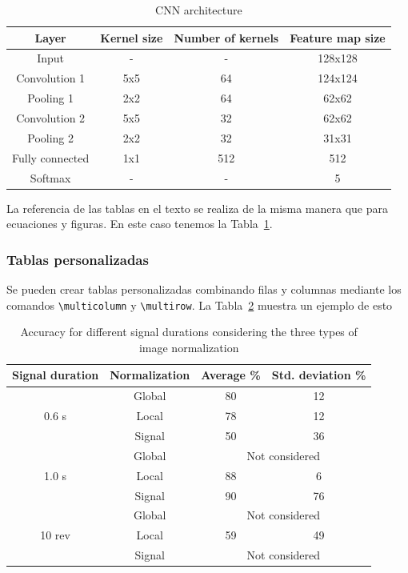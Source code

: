 \begin{table}[h]
	\centering
	\caption{CNN architecture}
	\label{tab:CNNArchitecture}
	\begin{tabular}{cccc}
		\toprule
		Layer & Kernel size & Number of kernels & Feature map size \\
		\midrule
		Input & - & - & 128x128 \\
		Convolution 1 & 5x5 & 64 & 124x124 \\
		Pooling 1 & 2x2 & 64 & 62x62 \\
		Convolution 2 & 5x5 & 32 & 62x62 \\
		Pooling 2 & 2x2 & 32 & 31x31 \\
		Fully connected & 1x1 & 512 & 512 \\
		Softmax & - & - & 5 \\
		\bottomrule
	\end{tabular}
\end{table}

La referencia de las tablas en el texto se realiza de la misma manera que para ecuaciones y figuras. En este caso tenemos la Tabla~\ref{tab:CNNArchitecture}.


\subsubsection{Tablas personalizadas}
Se pueden crear tablas personalizadas combinando filas y columnas mediante los comandos \verb!\multicolumn! y \verb!\multirow!. La Tabla~\ref{tab:norm-type} muestra un ejemplo de esto

\begin{table}[h]
	\centering
	\caption{Accuracy for different signal durations considering the three types of image normalization}
	\label{tab:norm-type}
	\begin{tabular}{cccc}
		\toprule
		Signal duration & Normalization & Average \% & Std. deviation \% \\
		\midrule
		\multirow{3}{*}{0.6 s} & Global & 80 & 12 \\
		 & Local & 78 & 12 \\
		 & Signal & 50 & 36 \\
             \midrule
		\multirow{3}{*}{1.0 s} & Global & \multicolumn{2}{c}{Not considered} \\
		 & Local & 88 & 6 \\
		 & Signal & 90 & 76 \\
             \midrule
		\multirow{3}{*}{10 rev} & Global & \multicolumn{2}{c}{Not considered} \\
		 & Local & 59 & 49 \\
		 & Signal & \multicolumn{2}{c}{Not considered} \\
		\bottomrule
	\end{tabular}
\end{table}


